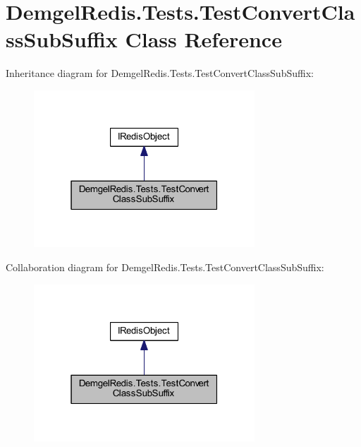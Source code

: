 \hypertarget{class_demgel_redis_1_1_tests_1_1_test_convert_class_sub_suffix}{}\section{Demgel\+Redis.\+Tests.\+Test\+Convert\+Class\+Sub\+Suffix Class Reference}
\label{class_demgel_redis_1_1_tests_1_1_test_convert_class_sub_suffix}


Inheritance diagram for Demgel\+Redis.\+Tests.\+Test\+Convert\+Class\+Sub\+Suffix\+:
\nopagebreak
\begin{figure}[H]
\begin{center}
\leavevmode
\includegraphics[width=235pt]{class_demgel_redis_1_1_tests_1_1_test_convert_class_sub_suffix__inherit__graph}
\end{center}
\end{figure}


Collaboration diagram for Demgel\+Redis.\+Tests.\+Test\+Convert\+Class\+Sub\+Suffix\+:
\nopagebreak
\begin{figure}[H]
\begin{center}
\leavevmode
\includegraphics[width=235pt]{class_demgel_redis_1_1_tests_1_1_test_convert_class_sub_suffix__coll__graph}
\end{center}
\end{figure}
